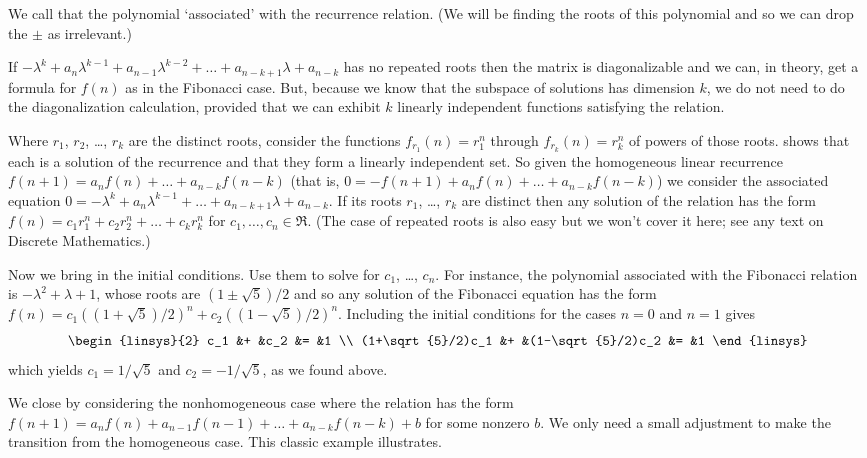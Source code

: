 We call that the polynomial `associated' with the recurrence relation.
(We will be finding the roots of this polynomial and so we can drop the $\pm$
as irrelevant.)

If  
$-\lambda^k+a_n\lambda^{k-1}+a_{n-1}\lambda^{k-2}
   +\dots+a_{n-k+1}\lambda+a_{n-k}$
has no repeated roots 
then the matrix is diagonalizable
and we can, in theory, get a formula for $f(n)$ as in the Fibonacci case.
But, because we know that the subspace of solutions has dimension $k$, 
we do not need to do the diagonalization calculation, provided that 
we can exhibit $k$ linearly independent functions satisfying the relation.

Where $r_1$, $r_2$, \ldots, $r_k$ are the distinct roots,
consider the functions $f_{r_1}(n)=r_1^n$ through
$f_{r_k}(n)=r_k^n$ of powers of those roots.
 shows that 
each is a solution of the recurrence and that they form a 
linearly independent set.
So given the homogeneous linear recurrence
$f(n+1)=a_nf(n)+\dots+a_{n-k}f(n-k)$
(that is, $0=-f(n+1)+a_nf(n)+\dots+a_{n-k}f(n-k)$)
we consider the associated equation
$0=-\lambda^k+a_n\lambda^{k-1}+\dots+a_{n-k+1}\lambda+a_{n-k}$.
If its roots $r_1$, \ldots, $r_k$ are distinct then
any solution of the relation has the form 
$f(n)=c_1r_1^n+c_2r_2^n+\dots+c_kr_k^n$ for $c_1, \dots, c_n\in\Re$.
(The case of repeated roots is also easy but we won't
cover it here; see any text on Discrete Mathematics.)

Now we bring in the initial conditions. 
Use them to solve for $c_1$, \ldots, $c_n$.
For instance, the polynomial associated with the Fibonacci relation is
$-\lambda^2+\lambda+1$, whose roots are $(1\pm\sqrt{5})/2$
and so any solution of the Fibonacci equation 
has the form $f(n)=c_1((1+\sqrt{5})/2)^n+c_2((1-\sqrt{5})/2)^n$.
Including the initial conditions for the cases $n=0$ and $n=1$ gives
\begin{equation*}
  \begin{linsys}{2}
    c_1               &+  &c_2               &=  &1  \\
    (1+\sqrt{5}/2)c_1 &+  &(1-\sqrt{5}/2)c_2 &=  &1
  \end{linsys}
\end{equation*}
which yields $c_1=1/\sqrt{5}$ and $c_2=-1/\sqrt{5}$, as we found above.

We close by considering the nonhomogeneous case
where the relation has the form
$f(n+1)=a_nf(n)+a_{n-1}f(n-1)+\dots+a_{n-k}f(n-k)+b$ for some nonzero $b$.
We only need a small adjustment
to make the transition from the homogeneous case.
This classic example illustrates.

